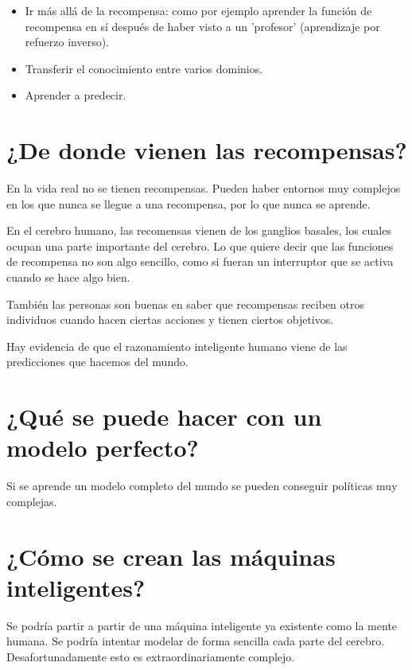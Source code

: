 \begin{itemize}
    \item Ir más allá de la recompensa: como por ejemplo aprender la función de recompensa en sí
        después de haber visto a un 'profesor' (aprendizaje por refuerzo inverso). 
    \item Transferir el conocimiento entre varios dominios.
    \item Aprender a predecir.
\end{itemize}

\section{¿De donde vienen las recompensas?}%
\label{sec:_de_donde_vienen_las_recompensas_}

En la vida real no se tienen recompensas. Pueden haber entornos muy complejos en los que nunca se
llegue a una recompensa, por lo que nunca se aprende.

En el cerebro humano, las recomensas vienen de los ganglios basales, los cuales ocupan
una parte importante del cerebro. Lo que quiere decir que las funciones de recompensa no
son algo sencillo, como si fueran un interruptor que se activa cuando se hace algo bien.

También las personas son buenas en saber que recompensas reciben otros individuos cuando hacen
ciertas acciones y tienen ciertos objetivos.

Hay evidencia de que el razonamiento inteligente humano viene de las predicciones que hacemos
del mundo.

\section{¿Qué se puede hacer con un modelo perfecto?}%
\label{sec:_que_se_puede_hacer_con_un_modelo_perfecto_}

Si se aprende un modelo completo del mundo se pueden conseguir políticas muy complejas.

\section{¿Cómo se crean las máquinas inteligentes?}%
\label{sec:_cómo_se_crean_las_máquinas_inteligentes_}

Se podría partir a partir de una máquina inteligente ya existente como la mente humana. Se
podría intentar modelar de forma sencilla cada parte del cerebro. Desafortunadamente esto es
extraordinariamente complejo.


